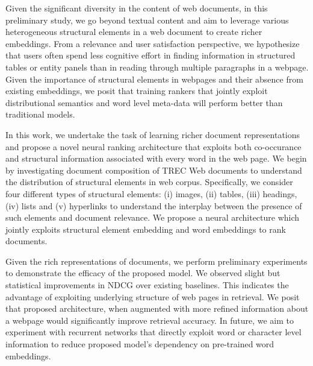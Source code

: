 Given the significant diversity in the content of web documents, 
in this preliminary study, we go beyond textual content and aim to leverage 
various heterogeneous structural elements in a web document to create richer embeddings. 
From a relevance and user satisfaction perspective, we hypothesize that users 
often spend less cognitive effort in finding information in structured 
tables or entity panels than in reading through multiple paragraphs in a webpage. 
Given the importance of structural elements in webpages and their absence from 
existing embeddings, we posit that training rankers that jointly exploit 
distributional semantics and word level meta-data will perform better than 
traditional models. 

In this work, we undertake the task of learning richer document representations 
and propose a novel neural ranking architecture that exploits both co-occurance and 
structural information associated with every word in the web page. 
We begin by investigating document composition of TREC Web documents to 
understand the distribution of structural elements in web corpus. Specifically, we consider four different 
types of structural elements: (i) images, (ii) tables, (iii) headings, (iv) lists and (v) hyperlinks to 
understand the interplay between the presence of such elements and document relevance. 
We propose a neural architecture which jointly exploits structural element embedding and 
word embeddings to rank documents.

Given the rich representations of documents, we perform preliminary experiments to 
demonstrate the efficacy of the proposed model. We observed 
slight but statistical improvements in NDCG over existing baselines. This indicates the 
advantage of exploiting underlying structure of web pages in retrieval. We posit that proposed 
architecture, when augmented with more refined information about a webpage would significantly 
improve retrieval accuracy. In future, we aim to experiment with recurrent networks that directly 
exploit word or character level information to reduce proposed model's dependency on 
pre-trained word embeddings.





